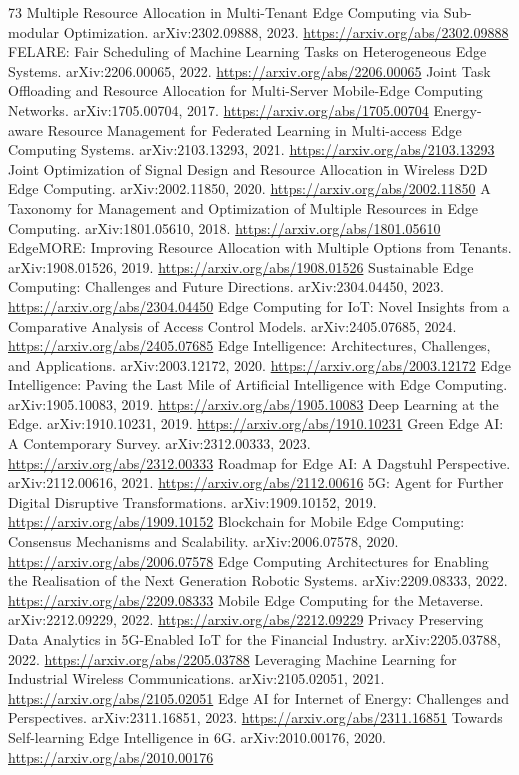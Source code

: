 \documentclass[11pt]{article}
\begin{document}
\begin{thebibliography}{73}
 Multiple Resource Allocation in Multi-Tenant Edge Computing via Sub-modular Optimization. arXiv:2302.09888, 2023. \url{https://arxiv.org/abs/2302.09888}
 FELARE: Fair Scheduling of Machine Learning Tasks on Heterogeneous Edge Systems. arXiv:2206.00065, 2022. \url{https://arxiv.org/abs/2206.00065}
 Joint Task Offloading and Resource Allocation for Multi-Server Mobile-Edge Computing Networks. arXiv:1705.00704, 2017. \url{https://arxiv.org/abs/1705.00704}
 Energy-aware Resource Management for Federated Learning in Multi-access Edge Computing Systems. arXiv:2103.13293, 2021. \url{https://arxiv.org/abs/2103.13293}
 Joint Optimization of Signal Design and Resource Allocation in Wireless D2D Edge Computing. arXiv:2002.11850, 2020. \url{https://arxiv.org/abs/2002.11850}
 A Taxonomy for Management and Optimization of Multiple Resources in Edge Computing. arXiv:1801.05610, 2018. \url{https://arxiv.org/abs/1801.05610}
 EdgeMORE: Improving Resource Allocation with Multiple Options from Tenants. arXiv:1908.01526, 2019. \url{https://arxiv.org/abs/1908.01526}
 Sustainable Edge Computing: Challenges and Future Directions. arXiv:2304.04450, 2023. \url{https://arxiv.org/abs/2304.04450}
 Edge Computing for IoT: Novel Insights from a Comparative Analysis of Access Control Models. arXiv:2405.07685, 2024. \url{https://arxiv.org/abs/2405.07685}
 Edge Intelligence: Architectures, Challenges, and Applications. arXiv:2003.12172, 2020. \url{https://arxiv.org/abs/2003.12172}
 Edge Intelligence: Paving the Last Mile of Artificial Intelligence with Edge Computing. arXiv:1905.10083, 2019. \url{https://arxiv.org/abs/1905.10083}
 Deep Learning at the Edge. arXiv:1910.10231, 2019. \url{https://arxiv.org/abs/1910.10231}
 Green Edge AI: A Contemporary Survey. arXiv:2312.00333, 2023. \url{https://arxiv.org/abs/2312.00333}
 Roadmap for Edge AI: A Dagstuhl Perspective. arXiv:2112.00616, 2021. \url{https://arxiv.org/abs/2112.00616}
 5G: Agent for Further Digital Disruptive Transformations. arXiv:1909.10152, 2019. \url{https://arxiv.org/abs/1909.10152}
 Blockchain for Mobile Edge Computing: Consensus Mechanisms and Scalability. arXiv:2006.07578, 2020. \url{https://arxiv.org/abs/2006.07578}
 Edge Computing Architectures for Enabling the Realisation of the Next Generation Robotic Systems. arXiv:2209.08333, 2022. \url{https://arxiv.org/abs/2209.08333}
 Mobile Edge Computing for the Metaverse. arXiv:2212.09229, 2022. \url{https://arxiv.org/abs/2212.09229}
 Privacy Preserving Data Analytics in 5G-Enabled IoT for the Financial Industry. arXiv:2205.03788, 2022. \url{https://arxiv.org/abs/2205.03788}
 Leveraging Machine Learning for Industrial Wireless Communications. arXiv:2105.02051, 2021. \url{https://arxiv.org/abs/2105.02051}
 Edge AI for Internet of Energy: Challenges and Perspectives. arXiv:2311.16851, 2023. \url{https://arxiv.org/abs/2311.16851}
 Towards Self-learning Edge Intelligence in 6G. arXiv:2010.00176, 2020. \url{https://arxiv.org/abs/2010.00176}
\end{thebibliography}
\end{document}
